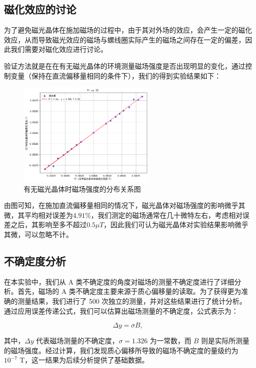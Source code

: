 \documentclass[12pt]{ctexart}
\numberwithin{equation}{section} %
\begin{document}
\subsection{磁化效应的讨论}
为了避免磁光晶体在施加磁场的过程中，由于其对外场的效应，会产生一定的磁化效应，从而导致磁光效应的磁场与螺线圈实际产生的磁场之间存在一定的偏差，因此我们需要对磁化效应进行讨论。

验证方法就是在在有无磁光晶体的环境测量磁场强度是否出现明显的变化，通过控制变量（保持在直流偏移量相同的条件下），我们的得到实验结果如下：
\begin{figure}[H] %
    \centering %
    \includegraphics[width=0.6\textwidth]{有无磁光晶体的对比.png} %
    \caption{有无磁光晶体时磁场强度的分布关系图} %
    \label{fig:有无磁光晶体时磁场强度的分布关系图} %
\end{figure}
由图可知，在施加直流偏移量相同的情况下，磁光晶体对磁场强度的影响微乎其微，其平均相对误差为$4.91\%$，我们测定的磁场通常在几十微特左右，考虑相对误差之后，其影响至多不超过$0.5\mu T$，因此我们可认为磁光晶体对实验结果影响微乎其微，可以忽略不计。

\subsection{不确定度分析}

在本实验中，我们从 A 类不确定度的角度对磁场的测量不确定度进行了详细分析。首先，磁场的 A 类不确定度主要来源于质心偏移量的读取。为了获得更为准确的测量结果，我们进行了 500 次独立的测量，并对这些结果进行了统计分析。通过应用误差传递公式，我们可以估算出磁场测量的不确定度，公式表示为：

\[
\Delta y = \sigma B,
\]

其中，$\Delta y$ 代表磁场测量的不确定度，$\sigma=1.326$ 为一常数，而 $B$ 则是实际所测量的磁场强度。经过计算，我们发现质心偏移所导致的磁场不确定度的量级约为 $10^{-7} \text{ T}$，这一结果为后续分析提供了基础数据。
\end{document}
